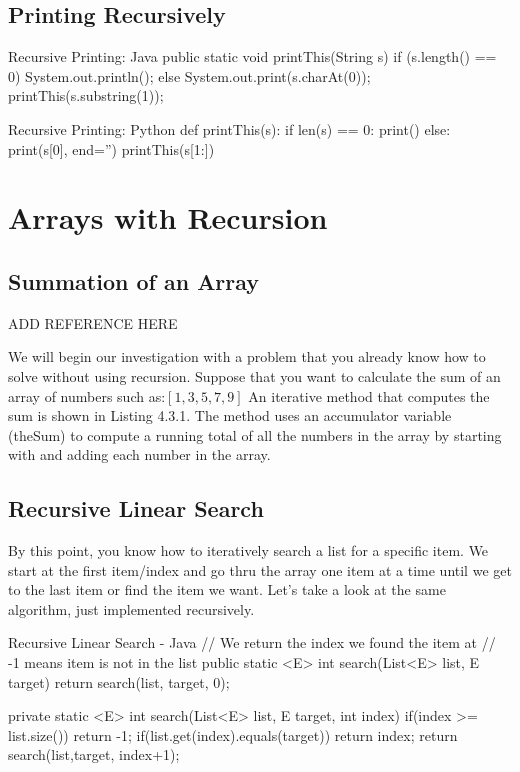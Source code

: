 \subsection{Printing Recursively}

\begin{javacode}{Recursive Printing: Java}
public static void printThis(String s){
	if (s.length() == 0) {
		System.out.println();
	} else {
		System.out.print(s.charAt(0));
		printThis(s.substring(1));
	}
}
\end{javacode}

\begin{pycode}{Recursive Printing: Python}
def printThis(s):
	if len(s) == 0:
		print()
	else:
		print(s[0], end='')
		printThis(s[1:])
\end{pycode}


\section{Arrays with Recursion}


\subsection{Summation of an Array}
ADD REFERENCE HERE


We will begin our investigation with a problem that you already know how to solve without using recursion. Suppose that you want to calculate the sum of an array of numbers such as:$[1, 3, 5, 7, 9]$ An iterative method that computes the sum is shown in Listing 4.3.1. The method uses an accumulator variable (theSum) to compute a running total of all the numbers in the array by starting with and adding each number in the array.



\subsection{Recursive Linear Search}

By this point, you know how to iteratively search a list for a specific item.  We start at the first item/index and go thru the array one item at a time until we get to the last item or find the item we want.   Let's take a look at the same algorithm, just implemented recursively.


\begin{javacode}{Recursive Linear Search - Java}
// We return the index we found the item at
// -1 means item is not in the list
public static <E> int search(List<E> list, E target){
	return search(list, target, 0);
}

private static <E> int search(List<E> list, E target, int index) {
	if(index >= list.size()){
		return -1;
	}
	if(list.get(index).equals(target)){
		return index;
	}
	return search(list,target, index+1);
}
\end{javacode}


